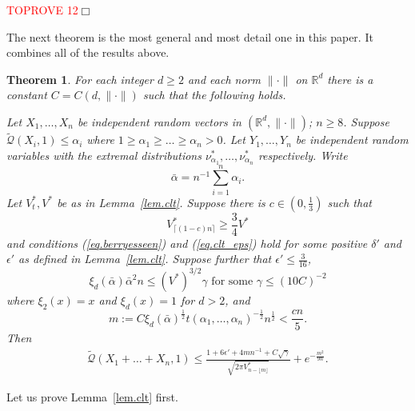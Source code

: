 \documentclass{article}
\newenvironment{proof}{\noindent{\bf Proof}}{\hspace*{\fill}$\Box$}
\newtheorem{theorem}{Theorem}[section]
\newcommand{\concdiam}{\tilde{\mathcal{Q}}}
\begin{document}
\begin{proof}\textcolor{red}{TOPROVE 12}\end{proof}

The next theorem is the most general and most detail one in this paper. It combines all of the results above.

\begin{theorem} \label{thm.main}
    For each integer $d \ge 2$ and each norm $\|\cdot\|$ on $\mathbb{R}^d$ there is a constant $C = C(d,\|\cdot\|)$ such that the following holds.

    Let $X_1, \dots, X_n$ be independent random vectors in $(\mathbb{R}^d, \|\cdot\|)$; $n \ge 8$.
    Suppose $\concdiam(X_i, 1) \le \alpha_i$ where $1 \ge \alpha_1 \ge \dots \ge \alpha_n > 0$. 
    Let $Y_1, \dots, Y_n$ be independent random variables with the extremal distributions $\nu^*_{\alpha_1}, \dots, \nu^*_{\alpha_n}$ respectively.
    Write  
    \[
        \bar{\alpha} = {n}^{-1} \sum_{i=1}^{n} \alpha_i.
\]
    Let $V^*_t, V^*$ be as in Lemma~\ref{lem.clt}. Suppose there is $c \in (0, \frac 1 3)$ such that
    \begin{equation}\label{eq.cVstar2}
        V^*_{\lceil(1-c) n\rceil} \ge \frac 3 4 V^*
    \end{equation}
and conditions (\ref{eq.berryesseen}) and (\ref{eq.clt_eps})
    hold for some positive $\delta'$ and $\epsilon'$ as defined in Lemma~\ref{lem.clt}.
    Suppose further that 
$\epsilon' \le \frac 3 {16}$, 
    \begin{equation}\label{eq.condition_near_one}
\xi_d(\bar{\alpha}) \bar{\alpha}^2 n \le (V^*)^{3/2}\gamma \mbox{ for some }\gamma \le  (10 C)^{-2} 
    \end{equation}
    where $\xi_2(x)=x$ and $\xi_d(x)=1$ for $d>2$,
    and    
    \begin{equation}\label{eq.m_eps}
        m:= C \xi_d(\bar{\alpha})^{\frac 1 2} t(\alpha_1, \dots, \alpha_n)^{- \frac 1 2} n^{\frac 1 2} < \frac {c n } 5.
    \end{equation}
    Then
    \begin{align*}\label{eq.main_inequality}
        \concdiam(X_1 + \dots + X_n, 1) \le \frac {1 + 6 \epsilon' + 4 m n^{-1} + C \sqrt{\gamma}} {\sqrt {2 \pi V^*_{n-\lfloor m \rfloor}}} + e^{-\frac{m^2} {9 n}}.
    \end{align*}
\end{theorem}

Let us prove Lemma~\ref{lem.clt} first.

\medskip
\end{document}
